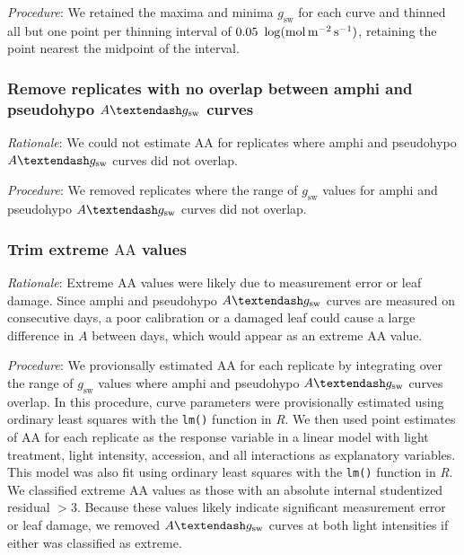 \documentclass[
  letterpaper,
  DIV=11,
  numbers=noendperiod]{scrartcl}
\newcommand{\aax}{$\mathrm{AA}$}
\newcommand{\agcurve}{$A \textendash g_\text{sw}$}
\newcommand{\gsw}{$g_\text{sw}$}
\begin{document}
\emph{Procedure}: We retained the maxima and minima \gsw{} for each
curve and thinned all but one point per thinning interval of
\(0.05~\log(\si{\mol\raiseto{-2}\meter\raiseto{-1}\second})\), retaining
the point nearest the midpoint of the interval.

\subsubsection{\texorpdfstring{Remove replicates with no overlap between
amphi and pseudohypo \agcurve{}
curves}{Remove replicates with no overlap between amphi and pseudohypo  curves}}\label{remove-replicates-with-no-overlap-between-amphi-and-pseudohypo-curves}

\emph{Rationale}: We could not estimate \aax{} for replicates where
amphi and pseudohypo \agcurve{} curves did not overlap.

\emph{Procedure}: We removed replicates where the range of \gsw{} values
for amphi and pseudohypo \agcurve{} curves did not overlap.

\subsubsection{\texorpdfstring{Trim extreme \aax{}
values}{Trim extreme  values}}\label{trim-extreme-values}

\emph{Rationale}: Extreme \aax{} values were likely due to measurement
error or leaf damage. Since amphi and pseudohypo \agcurve{} curves are
measured on consecutive days, a poor calibration or a damaged leaf could
cause a large difference in \(A\) between days, which would appear as an
extreme \aax{} value.

\emph{Procedure}: We provionsally estimated \aax{} for each replicate by
integrating over the range of \gsw{} values where amphi and pseudohypo
\agcurve{} curves overlap. In this procedure, curve parameters were
provisionally estimated using ordinary least squares with the
\texttt{lm()} function in \emph{R}. We then used point estimates of
\aax{} for each replicate as the response variable in a linear model
with light treatment, light intensity, accession, and all interactions
as explanatory variables. This model was also fit using ordinary least
squares with the \texttt{lm()} function in \emph{R}. We classified
extreme \aax{} values as those with an absolute internal studentized
residual \(> 3\). Because these values likely indicate significant
measurement error or leaf damage, we removed \agcurve{} curves at both
light intensities if either was classified as extreme.
\end{document}
